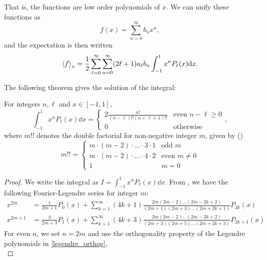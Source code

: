 \documentclass[../../main.tex]{subfiles}
\begin{document}
\begin{refsection}
	That is, the functions are low order polynomials of $x$.
	We can unify these functions as
	$$f(x) = \sum_{n = 0}^\infty b_n x^n,$$
	and the expectation is then written
	$$\left\langle f \right\rangle_{\pi} = \frac{1}{2} \sum_{\ell=0}^\infty \sum_{n = 0}^\infty (2\ell+1) a_\ell b_n \int_{-1}^1 x^n P_\ell(x) \dd x.$$

	The following theorem gives the solution of the integral:

	\begin{theorem}
		For integers $n,\ell$ and $x \in [-1, 1]$,
		\begin{equation*}
			\int_{-1}^1 x^n P_\ell(x) \dd x =
			\begin{cases}
				2 \frac{n!}{(n - \ell)!! (n + \ell + 1)!!} & \text{even } n - \ell \ge 0 \\
				0                                          & \text{otherwise }
			\end{cases},
		\end{equation*}
		where $m!!$ denotes the double factorial for non-negative integer $m$, given by (\cite[8.33b]{arfkenMathematicalMethodsPhysicists2005})
		\begin{equation*}
			m!! = \begin{cases}
				m \cdot (m-2) \cdot \ldots \cdot 3 \cdot 1 & \text{odd } m        \\
				m \cdot (m-2) \cdot \ldots \cdot 4 \cdot 2 & \text{even } m \ne 0 \\
				1                                          & m = 0
			\end{cases}
		\end{equation*}
	\end{theorem}
	\begin{proof}
		We write the integral as $I = \int_{-1}^1 x^n P_\ell(x) \dd x$.
		From \cite[Eqs. 8.922.1-2]{gradshteynTableIntegralsSeries2007}, we have the following Fourier-Legendre series for integer $m$:
		\begin{align}
			x^{2m}     & = \frac{1}{2m + 1} P_0(x) + \sum_{k=1}^{\infty}(4k + 1) \frac{2m (2m - 2) \ldots(2m - 2k + 2)}{(2m + 1)(2m + 3) \ldots (2m + 2k + 1)} P_{2k}(x)     \\
			x^{2m + 1} & = \frac{3}{2m + 3} P_1(x) + \sum_{k=1}^{\infty}(4k + 3) \frac{2m (2m - 2) \ldots(2m - 2k + 2)}{(2m + 3)(2m + 5) \ldots (2m + 2k + 3)} P_{2k + 1}(x)
		\end{align}
		For even $n$, we set $n = 2m$ and use the orthogonality property of the Legendre polynomials in \cref{legendre_orthog},
		\begin{equation*}

\end{equation*}
\end{proof}
\end{refsection}
\end{document}
